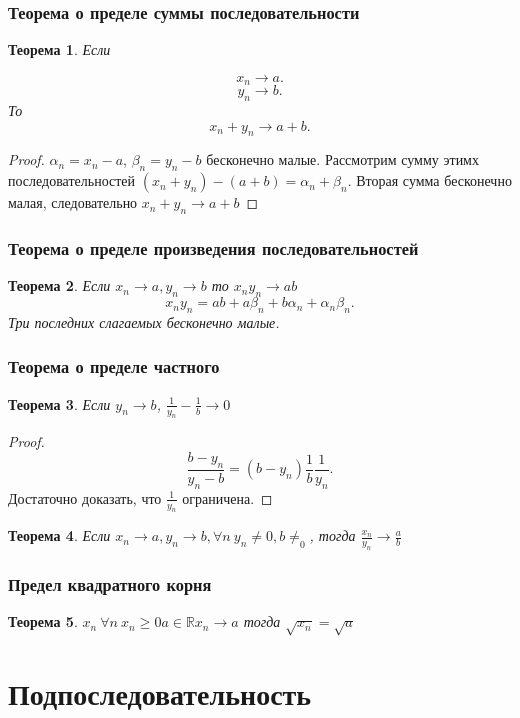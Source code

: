 \documentclass[a4paper]{scrartcl}
\newtheorem{theorem}{Теорема}
\begin{document}
\subsubsection{Теорема о пределе суммы последовательности}
\begin{theorem}
	Если

	\[

		x_n \to a
		.\]
	\[
		y_n \to b
		.\]
	То
	\[
		x_n + y_n \to a + b
		.\]
\end{theorem}
\begin{proof}
	$\alpha_n = x_n - a$,  $\beta_n = y_n - b$ бесконечно малые.
	Рассмотрим  сумму этимх последовательностей $(x_n + y_n) - (a + b) = \alpha_n + \beta_n$. Вторая сумма бесконечно малая, следовательно  $x_n + y_n \to a + b$
\end{proof}
\subsubsection{Теорема о пределе произведения последовательностей}
\begin{theorem}
	Если $x_n \to a, y_n \to b $ то $ x_n y_n \to ab$
	\[
		x_n y_n = ab + a\beta_n + b \alpha_n + \alpha_n \beta_n
		.\]
	Три последних слагаемых бесконечно малые.
\end{theorem}
\subsubsection{Теорема о пределе частного}
\begin{theorem}
	Если $y_n \to b$, $\frac{1}{y_n} - \frac{1}{b} \to 0$
\end{theorem}
\begin{proof}
	\[
		\frac{b - y_n}{y_n- b} = (b - y_n)  \frac{1}{b}\frac{1}{y_n}
		.\]
	Достаточно доказать, что $\frac{1}{y_n}$ ограничена.
\end{proof}
\begin{theorem}
	Если $x_n \to a, y_n \to b , \forall n ~ y_n \neq 0, b\neq_0$, тогда
	$\frac{x_n}{y_n} \to \frac{a}{b}$
\end{theorem}
\subsubsection{Предел квадратного корня}
\begin{theorem}
	$x_n ~\forall n ~x_n \ge 0  a \in \mathbb{R} x_n \to a$ тогда $\sqrt{x_n} = \sqrt{a}$
\end{theorem}
\section{Подпоследовательность}
\end{document}
